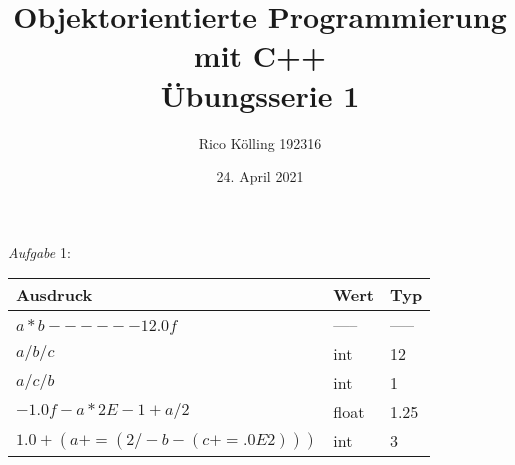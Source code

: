 \documentclass[12pt]{article}
\title{Objektorientierte Programmierung mit C++ \\ Übungsserie 1}
\author{Rico Kölling 192316}
\date{24. April 2021}
\begin{document}
\maketitle
\textit{Aufgabe} 1: \\ [16pt]
	\begin{tabular}{l|l|l|}

		Ausdruck & Wert & Typ\\ \hline
		$a * b - - - - - - 12.0f$ & ----- & ----- \\ \hline
		$a / b / c $ & int & 12 \\ \hline
		$a / c / b $ & int & 1 \\ \hline
		$-1.0f - a*2 E -1 + a/ 2$ & float & 1.25 \\ \hline
		$1.0 + (a += ( 2 / - b -(c += .0E2)))$ & int & 3 \\ \hline

	\end{tabular}
	
\end{document}
